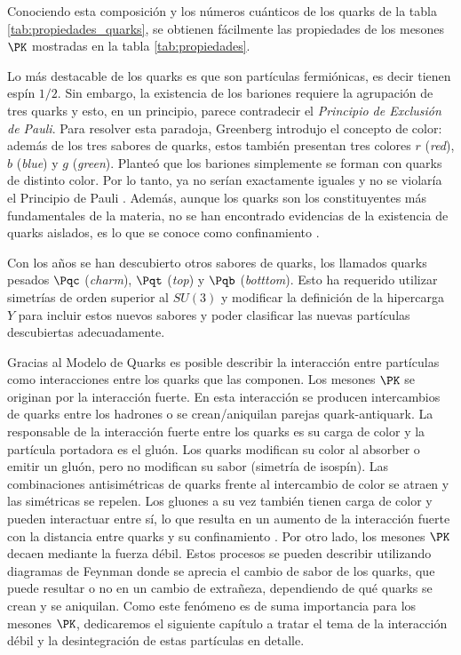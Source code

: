 Conociendo esta composición y los números cuánticos de los quarks de la tabla \ref{tab:propiedades_quarks}, se obtienen fácilmente las propiedades de los mesones $\PK$ mostradas en la tabla \ref{tab:propiedades}.

Lo más destacable de los quarks es que son partículas fermiónicas, es decir tienen espín $1/2$. Sin embargo, la existencia de los bariones requiere la agrupación de tres quarks y esto, en un principio, parece contradecir el \textit{Principio de Exclusión de Pauli}. Para resolver esta paradoja, Greenberg introdujo el concepto de color: además de los tres sabores de quarks, estos también presentan tres colores $r$ (\textit{red}), $b$ (\textit{blue}) y $g$ (\textit{green}). Planteó que los bariones simplemente se forman con quarks de distinto color. Por lo tanto, ya no serían exactamente iguales y no se violaría el Principio de Pauli \cite{Griffiths2008}. Además, aunque los quarks son los constituyentes más fundamentales de la materia, no se han encontrado evidencias de la existencia de quarks aislados, es lo que se conoce como confinamiento \cite{Pais}.

Con los años se han descubierto otros sabores de quarks, los llamados quarks pesados $\Pqc$ (\textit{charm}), $\Pqt$ (\textit{top}) y $\Pqb$ (\textit{botttom}). Esto ha requerido utilizar simetrías de orden superior al $SU(3)$ y modificar la definición de la hipercarga $Y$ para incluir estos nuevos sabores y poder clasificar las nuevas partículas descubiertas adecuadamente.

Gracias al Modelo de Quarks es posible describir la interacción entre partículas como interacciones entre los quarks que las componen. Los mesones $\PK$ se originan por la interacción fuerte. En esta interacción se producen intercambios de quarks entre los hadrones o se crean/aniquilan parejas quark-antiquark. La responsable de la interacción fuerte entre los quarks es su carga de color y la partícula portadora es el gluón.  Los quarks modifican su color al absorber o emitir un gluón, pero no modifican su sabor (simetría de isospín). Las combinaciones antisimétricas de quarks frente al intercambio de color se atraen y las simétricas se repelen. Los gluones a su vez también tienen carga de color y pueden interactuar entre sí, lo que resulta en un aumento de la interacción fuerte con la distancia entre quarks y su confinamiento \cite{notas2020}. Por otro lado, los mesones $\PK$ decaen mediante la fuerza débil. Estos procesos se pueden describir utilizando diagramas de Feynman donde se aprecia el cambio de sabor de los quarks, que puede resultar o no en un cambio de extrañeza, dependiendo de qué quarks se crean y se aniquilan. Como este fenómeno es de suma importancia para los mesones $\PK$, dedicaremos el siguiente capítulo a tratar el tema de la interacción débil y la desintegración de estas partículas en detalle.\\

